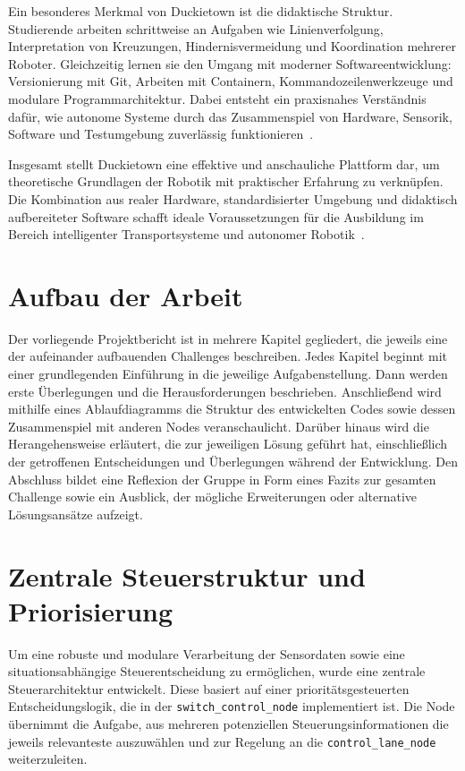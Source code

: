 Ein besonderes Merkmal von Duckietown ist die didaktische Struktur. Studierende arbeiten schrittweise an 
Aufgaben wie Linienverfolgung, Interpretation von Kreuzungen, Hindernisvermeidung und Koordination mehrerer 
Roboter. Gleichzeitig lernen sie den Umgang mit moderner Softwareentwicklung: Versionierung mit Git, Arbeiten 
mit Containern, Kommandozeilenwerkzeuge und modulare Programmarchitektur. Dabei entsteht ein praxisnahes 
Verständnis dafür, wie autonome Systeme durch das Zusammenspiel von Hardware, Sensorik, Software und 
Testumgebung zuverlässig funktionieren~\cite{Duckietown_Daffy_Docs}. 

Insgesamt stellt Duckietown eine effektive und anschauliche Plattform dar, um theoretische Grundlagen der 
Robotik mit praktischer Erfahrung zu verknüpfen. Die Kombination aus realer Hardware, standardisierter 
Umgebung und didaktisch aufbereiteter Software schafft ideale Voraussetzungen für die Ausbildung im Bereich 
intelligenter Transportsysteme und autonomer Robotik~\cite{Duckietown_Daffy_Docs}. 


\section{Aufbau der Arbeit}
\label{sec:Aufbau der Arbeit}
Der vorliegende Projektbericht ist in mehrere Kapitel gegliedert, die jeweils eine der aufeinander 
aufbauenden Challenges beschreiben. Jedes Kapitel beginnt mit einer grundlegenden Einführung in die 
jeweilige Aufgabenstellung. Dann werden erste Überlegungen und die Herausforderungen beschrieben.
Anschließend wird mithilfe eines Ablaufdiagramms die Struktur des entwickelten Codes sowie dessen Zusammenspiel 
mit anderen Nodes veranschaulicht. Darüber hinaus wird die Herangehensweise erläutert, die zur jeweiligen 
Lösung geführt hat, einschließlich der getroffenen Entscheidungen und Überlegungen während der Entwicklung. 
Den Abschluss bildet eine Reflexion der Gruppe in Form eines Fazits zur gesamten Challenge sowie ein Ausblick, 
der mögliche Erweiterungen oder alternative Lösungsansätze aufzeigt.

\section{Zentrale Steuerstruktur und Priorisierung}
\label{sec:ZentraleSteuerung}

Um eine robuste und modulare Verarbeitung der Sensordaten sowie eine situationsabhängige Steuerentscheidung zu ermöglichen, wurde eine zentrale Steuerarchitektur entwickelt. Diese basiert auf einer prioritätsgesteuerten Entscheidungslogik, die in der \texttt{switch\_control\_node} implementiert ist. Die Node übernimmt die Aufgabe, aus mehreren potenziellen Steuerungsinformationen die jeweils relevanteste auszuwählen und zur Regelung an die \texttt{control\_lane\_node} weiterzuleiten.

